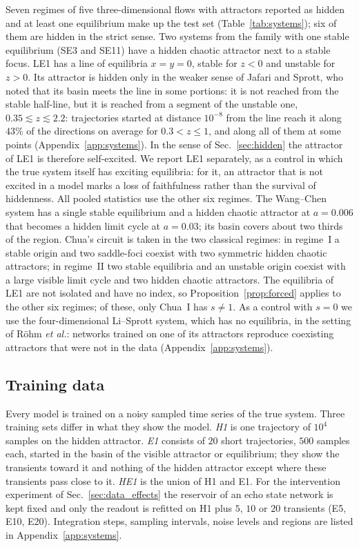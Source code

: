 Seven regimes of five three-dimensional flows with attractors reported as hidden and at least one equilibrium make up the
test set (Table~\ref{tab:systems}); six of them are hidden in the strict sense.\cite{Molaie2013,JafariSprott2013,WangChen2012,Leonov2011PLA,Stankevich2017} Two systems from
the family with one stable equilibrium (SE3 and SE11) have a hidden chaotic attractor next to a stable focus. LE1 has a line
of equilibria $x=y=0$, stable for $z<0$ and unstable for $z>0$. Its attractor is hidden only in the weaker sense of
Jafari and Sprott,\cite{JafariSprott2013} who noted that its basin meets the line in some portions: it is not reached from
the stable half-line, but it is reached from a segment of the unstable one, $0.35\lesssim z\lesssim2.2$: trajectories
started at distance $10^{-8}$ from the line reach it along $43\%$ of the directions on average for $0.3<z\le1$, and along
all of them at some points (Appendix~\ref{app:systems}).
In the sense of Sec.~\ref{sec:hidden} the attractor of LE1 is therefore self-excited. We report LE1 separately, as a
control in which the true system itself has exciting equilibria: for it, an attractor that is not excited in a model
marks a loss of faithfulness rather than the survival of hiddenness. All pooled statistics use the other six regimes.
The Wang--Chen system has a single stable equilibrium and a hidden chaotic attractor at
$a=0.006$ that becomes a hidden limit cycle at $a=0.03$; its basin covers about two thirds of the region. Chua's circuit is
taken in the two classical regimes: in regime~I a stable origin and two saddle-foci coexist with two symmetric hidden
chaotic attractors; in regime~II two stable equilibria and an unstable origin coexist with a large visible limit cycle
and two hidden chaotic attractors. The equilibria of LE1 are not isolated and have no index, so
Proposition~\ref{prop:forced} applies to the other six regimes; of these, only Chua~I has $s\neq1$. As a control with $s=0$ we
use the four-dimensional Li--Sprott system, which has no equilibria, in the setting of R\"ohm
\textit{et al.}:\cite{Rohm2021} networks trained on one of its attractors reproduce coexisting attractors that were not in
the data (Appendix~\ref{app:systems}).

\subsection{Training data}
\label{sec:data}

Every model is trained on a noisy sampled time series of the true system. Three training sets differ in what they show
the model. \emph{H1} is one trajectory of $10^4$ samples on the hidden attractor. \emph{E1} consists of $20$ short
trajectories, $500$ samples each, started in the basin of the visible attractor or equilibrium; they show the transients
toward it and nothing of the hidden attractor except where these transients pass close to it. \emph{HE1} is the union of
H1 and E1. For the intervention experiment of Sec.~\ref{sec:data_effects} the reservoir of an echo state network is kept
fixed and only the readout is refitted on H1 plus $5$, $10$ or $20$ transients (E5, E10, E20). Integration steps, sampling
intervals, noise levels and regions are listed in Appendix~\ref{app:systems}.
